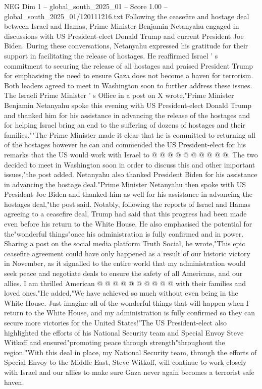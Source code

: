 \begin{textsample}{NEG Dim 1 – global\_south\_2025\_01 – Score 1.00 – global\_south\_2025\_01/120111216.txt}  \label{ex:f1_neg_158}
Following the ceasefire and hostage deal between Israel and Hamas, Prime Minister Benjamin Netanyahu engaged in discussions with US President-elect Donald Trump and current President Joe Biden.
During these conversations, Netanyahu expressed his gratitude for their support in facilitating the release of hostages.
He reaffirmed Israel ' s commitment to securing the release of all hostages and praised President Trump for emphasising the need to ensure Gaza does not become a haven for terrorism.
Both leaders agreed to meet in Washington soon to further address these issues.
The Israeli Prime Minister ' s Office in a post on X wrote,"Prime Minister Benjamin Netanyahu spoke this evening with US President-elect Donald Trump and thanked him for his assistance in advancing the release of the hostages and for helping Israel bring an end to the suffering of dozens of hostages and their families.""The Prime Minister made it clear that he is committed to returning all of the hostages however he can and commended the US President-elect for his remarks that the US would work with Israel to @ @ @ @ @ @ @ @ @ @.
The two decided to meet in Washington soon in order to discuss this and other important issues,"the post added.
Netanyahu also thanked President Biden for his assistance in advancing the hostage deal."Prime Minister Netanyahu then spoke with US President Joe Biden and thanked him as well for his assistance in advancing the hostages deal,"the post said.
Notably, following the reports of Israel and Hamas agreeing to a ceasefire deal, Trump had said that this progress had been made even before his return to the White House.
He also emphasised the potential for the"wonderful things"once his administration is fully confirmed and in power.
Sharing a post on the social media platform Truth Social, he wrote,"This epic ceasefire agreement could have only happened as a result of our historic victory in November, as it signalled to the entire world that my administration would seek peace and negotiate deals to ensure the safety of all Americans, and our allies.
I am thrilled American @ @ @ @ @ @ @ @ @ @ with their families and loved ones."He added,"We have achieved so much without even being in the White House.
Just imagine all of the wonderful things that will happen when I return to the White House, and my administration is fully confirmed so they can secure more victories for the United States!"The US President-elect also highlighted the efforts of his National Security team and Special Envoy Steve Witkoff and ensured"promoting peace through strength"throughout the region."With this deal in place, my National Security team, through the efforts of Special Envoy to the Middle East, Steve Witkoff, will continue to work closely with Israel and our allies to make sure Gaza never again becomes a terrorist safe haven.

\end{textsample}
